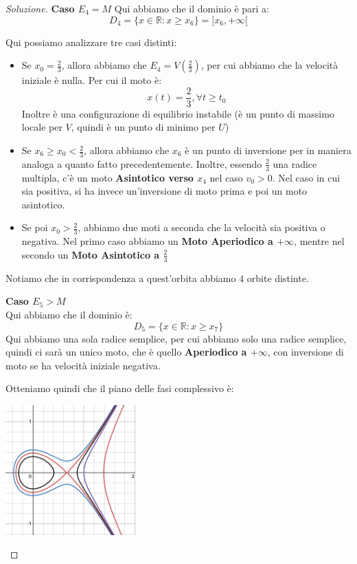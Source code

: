 \documentclass[11pt,a4paper,twoside]{article}
\theoremstyle{definition}
\newenvironment{sol}
	{\renewcommand\qedsymbol{$\blacksquare$}\begin{proof}[Soluzione]}
	{\end{proof}}
\begin{document}
\begin{sol}
	\textbf{Caso $E_4= M$}
	Qui abbiamo che il dominio è pari a:
	\[ D_4 = \{x \in \mathbb R: x\geq x_6\} = [x_6, + \infty[ \]
	\begin{center}
	\end{center}
	Qui possiamo analizzare tre casi distinti:
	\begin{itemize}
		\item Se $x_0 = \frac 23$, allora abbiamo che $E_4 = V(\frac 23)$, per cui abbiamo che la velocità iniziale è nulla. Per cui il moto è:
			\[ x(t) = \frac 23, \forall t \geq t_0 \]
			Inoltre è una configurazione di equilibrio instabile (è un punto di massimo locale per $V$, quindi è un punto di minimo per $U$)
		\item Se $x_6 \geq x_0 < \frac 23$, allora abbiamo che $x_6$ è un punto di inversione per in maniera analoga a quanto fatto precedentemente. Inoltre, essendo $\frac 23$ una radice multipla, c'è un moto \textbf{Asintotico verso $x_4$} nel caso $v_0>0$. Nel caso in cui sia positiva, si ha invece un'inversione di moto prima e poi un moto asintotico.
		\item Se poi $x_0>\frac 23$, abbiamo due moti a seconda che la velocità sia positiva o negativa. Nel primo caso abbiamo un \textbf{Moto Aperiodico a $+\infty$}, mentre nel secondo un \textbf{Moto Asintotico a $\frac 23$}
	\end{itemize}
	Notiamo che in corrispondenza a quest'orbita abbiamo $4$ orbite distinte.

	\textbf{Caso $E_5>M$}\\
	Qui abbiamo che il dominio è:
	\[ D_5 = \{ x \in \mathbb R: x \geq x_7 \} \]
	Qui abbiamo una sola radice semplice, per cui abbiamo solo una radice semplice, quindi ci sarà un unico moto, che è quello \textbf{Aperiodico a $+\infty$}, con inversione di moto se ha velocità iniziale negativa.

	Otteniamo quindi che il piano delle fasi complessivo è:
	\begin{center}
		\includegraphics[height=5cm]{Grafico1}
	\end{center}
\end{sol}
\end{document}
